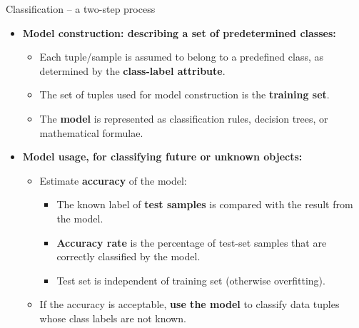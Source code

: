 \documentclass[aspectratio=169,t,table]{beamer}
\begin{document}
  {
    \begin{frame}{Classification -- a two-step process}
        \begin{itemize}
            \item \textbf{Model construction: describing a set of predetermined classes:}
            \begin{itemize}
              \item Each tuple/sample is assumed to belong to a predefined class, as determined by the \textbf{\color{airforceblue}class-label attribute}.
              \item The set of tuples used for model construction is the \textbf{\color{airforceblue}training set}.
              \item The \textbf{\color{airforceblue}model} is represented as classification rules, decision trees, or mathematical formulae.
            \end{itemize}
            \item \textbf{Model usage, for classifying future or unknown objects:}
            \begin{itemize}
              \item Estimate \textbf{\color{airforceblue}accuracy} of the model:
              \begin{itemize}
                \item The known label of \textbf{test samples} is compared with the result from the model.
                \item \textbf{Accuracy rate} is the percentage of test-set samples that are correctly classified by the model.
                \item Test set is independent of training set (otherwise overfitting).
              \end{itemize}
              \item If the accuracy is acceptable, \textbf{\color{airforceblue}use the model} to classify data tuples whose class labels are not known.
            \end{itemize}
        \end{itemize}
    \end{frame}
  }
\end{document}
